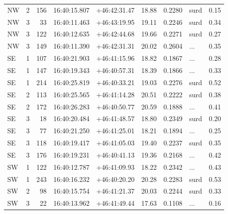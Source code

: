 \begin{tabular}{lrrllrrlr}
  NW &       2 &    156 &  16:40:15.807 &  +46:42:31.47 &  18.88 &    0.2280 &       surd &        0.15 \\
  NW &       3 &     33 &  16:40:11.463 &  +46:43:19.95 &  19.11 &    0.2246 &       surd &        0.34 \\
  NW &       3 &    122 &  16:40:12.635 &  +46:42:44.68 &  19.66 &    0.2271 &       surd &        0.27 \\
  NW &       3 &    149 &  16:40:11.390 &  +46:42:31.31 &  20.02 &    0.2604 &        ... &        0.35 \\
  SE &       1 &    107 &  16:40:21.903 &  +46:41:15.96 &  18.82 &    0.1867 &        ... &        0.28 \\
  SE &       1 &    147 &  16:40:19.343 &  +46:40:57.31 &  18.39 &    0.1866 &        ... &        0.33 \\
  SE &       1 &    214 &  16:40:25.819 &  +46:40:33.21 &  19.03 &    0.2276 &       surd &        0.52 \\
  SE &       2 &    113 &  16:40:25.565 &  +46:41:14.28 &  20.51 &    0.2222 &       surd &        0.38 \\
  SE &       2 &    172 &  16:40:26.283 &  +46:40:50.77 &  20.59 &    0.1888 &        ... &        0.41 \\
  SE &       3 &     18 &  16:40:20.484 &  +46:41:48.57 &  18.80 &    0.2349 &       surd &        0.20 \\
  SE &       3 &     77 &  16:40:21.250 &  +46:41:25.01 &  18.21 &    0.1894 &        ... &        0.25 \\
  SE &       3 &    118 &  16:40:19.417 &  +46:41:05.03 &  19.40 &    0.2237 &       surd &        0.35 \\
  SE &       3 &    176 &  16:40:19.231 &  +46:40:41.13 &  19.36 &    0.2168 &        ... &        0.42 \\
  SW &       1 &    122 &  16:40:12.787 &  +46:41:09.93 &  18.22 &    0.2342 &        ... &        0.43 \\
  SW &       1 &    243 &  16:40:16.232 &  +46:40:20.20 &  20.28 &    0.2283 &       surd &        0.53 \\
  SW &       2 &     98 &  16:40:15.754 &  +46:41:21.37 &  20.03 &    0.2244 &       surd &        0.33 \\
  SW &       3 &     22 &  16:40:13.962 &  +46:41:49.44 &  17.63 &    0.1108 &        ... &        0.16 \\
\bottomrule
\end{tabular}
